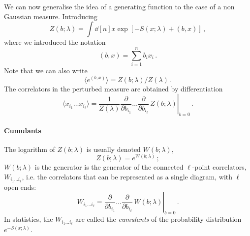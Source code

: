 \documentclass[notes.tex]{subfiles}
\begin{document}
We can now generalise the idea of a generating function to the case of
a non Gaussian measure. Introducing
\begin{equation}
  \label{eq:GenFunctPert}
  Z(b;\lambda) = \int \dd[n]{x} \exp\left[
    -S(x;\lambda) + (b,x)
    \right]\, ,
\end{equation}
where we introduced the notation
\begin{equation}
  \label{eq:ScalProd}
  (b,x) = \sum_{i=1}^n b_i x_i\, .
\end{equation}
Note that we can also write
\begin{equation}
  \label{eq:GenFunctPertTwo}
  \langle e^{(b,x)} \rangle = Z(b;\lambda)/Z(\lambda)\, .
\end{equation}
The correlators in the perturbed measure are obtained by
differentiation
\begin{equation}
  \label{eq:CorrGenPert}
  \langle x_{i_1} \ldots x_{i_\ell}\rangle = \frac{1}{Z(\lambda)} \left.
  \frac{\partial}{\partial b_{i_1}} \ldots \frac{\partial}{\partial b_{i_\ell}}\,
  Z(b;\lambda)
  \right|_{b=0} \, .
\end{equation}

\paragraph{Cumulants}

The logarithm of $Z(b;\lambda)$ is usually denoted $W(b;\lambda)$,
\begin{equation}
  \label{eq:WGenDef}
  Z(b;\lambda) = e^{W(b;\lambda)}\, ;
\end{equation}
$W(b;\lambda)$ is the generator is the generator of the connected
$\ell$-point correlators, $W_{i_1 \ldots i_\ell}$, i.e. the correlators that can be represented as a single
diagram, with $\ell$ open ends:
\begin{equation}
  \label{eq:DiffWGen}
  W_{i_1 \ldots i_\ell} = \left.
  \frac{\partial}{\partial b_{i_1}} \ldots \frac{\partial}{\partial b_{i_\ell}}\,
  W(b;\lambda)
  \right|_{b=0} \, .
\end{equation}
In statistics, the $W_{i_1 \ldots i_\ell}$ are called the \emph{cumulants} of the probability distribution $e^{-S(x;\lambda)}$.
\end{document}
